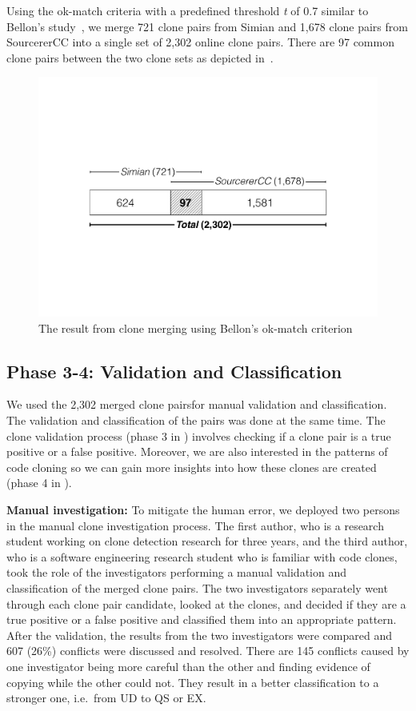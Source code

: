 \documentclass[10pt,journal,compsoc]{IEEEtran}
\begin{document}
Using the ok-match criteria with a predefined threshold \textit{t} of 0.7
similar to Bellon's study~\cite{Bellon2007}, we merge 721 clone pairs from
Simian and 1,678 clone pairs from SourcererCC into a single set of 2,302 online
clone pairs. There are 97 common clone pairs between the two clone sets 
as depicted in~.

\begin{figure}
	\centering
	\includegraphics[width=0.8\linewidth]{clone_merging}
	\caption{The result from clone merging using Bellon's ok-match criterion}
	\label{fig:clonemerging}
\end{figure}

\subsection{Phase 3-4: Validation and Classification}
We used the 2,302 merged clone pairsfor
manual validation and classification.
The validation and classification of the pairs was done at the same time. 
The clone validation process (phase 3 in ) involves checking 
if a clone pair is a true positive or a false positive. 
Moreover, we are also interested in 
the patterns of code cloning so we can gain more insights into 
how these clones are created (phase 4 in ). 

\textbf{Manual investigation:} 
To mitigate the human error, we deployed two persons in the manual clone
investigation process. The first author, who is a research student working on
clone detection research for three years, and the third author, who is a
software engineering research student who is familiar with code clones, took the
role of the investigators performing a manual validation and classification of
the merged clone pairs. The two investigators separately went through each clone
pair candidate, looked at the clones, and decided if they are a true positive or
a false positive and classified them into an appropriate pattern. After the
validation, the results from the two investigators were compared and 607 (26\%)
conflicts were discussed and resolved. There are 145 conflicts caused by
one investigator being more careful than the other and finding evidence of 
copying while the other could not. They result in a better classification
to a stronger one, i.e.~from UD to QS or EX. 
\end{document}
